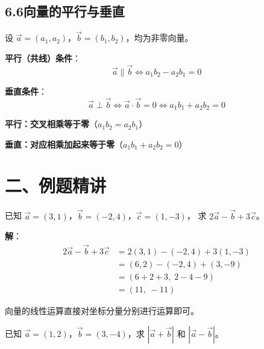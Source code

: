 \documentclass[12pt, a4paper]{ctexart}
\begin{document}
\subsection*{6.6\quad 向量的平行与垂直}

\begin{knowledgebox}[平行与垂直的判定]
设 $\vec{a}=(a_1,a_2)$，$\vec{b}=(b_1,b_2)$，均为非零向量。

\medskip
\textbf{平行（共线）条件}：
\[
\vec{a} \parallel \vec{b} \iff a_1 b_2 - a_2 b_1 = 0
\]

\medskip
\textbf{垂直条件}：
\[
\vec{a} \perp \vec{b} \iff \vec{a}\cdot\vec{b} = 0 \iff a_1 b_1 + a_2 b_2 = 0
\]
\end{knowledgebox}

\begin{tipbox}[记忆口诀]
\textbf{平行：交叉相乘等于零}（$a_1 b_2 = a_2 b_1$）

\textbf{垂直：对应相乘加起来等于零}（$a_1 b_1 + a_2 b_2 = 0$）
\end{tipbox}

\vspace{10pt}

\section*{\textcolor{examorange}{二、例题精讲}}

\begin{examplebox}[【例题1】向量加减法运算]
已知 $\vec{a}=(3,1)$，$\vec{b}=(-2,4)$，$\vec{c}=(1,-3)$，
求 $2\vec{a} - \vec{b} + 3\vec{c}$。
\end{examplebox}

\textbf{解}：
\begin{align*}
2\vec{a} - \vec{b} + 3\vec{c}
  &= 2(3,1) - (-2,4) + 3(1,-3) \\
  &= (6,2) - (-2,4) + (3,-9) \\
  &= (6+2+3,\; 2-4-9) \\
  &= (11,\;-11)
\end{align*}

\begin{tipbox}[方法总结]
向量的线性运算直接对坐标分量分别进行运算即可。
\end{tipbox}

\begin{examplebox}[【例题2】求向量的模]
已知 $\vec{a}=(1,2)$，$\vec{b}=(3,-4)$，求 $|\vec{a}+\vec{b}|$ 和 $|\vec{a}-\vec{b}|$。
\end{examplebox}
\end{document}
